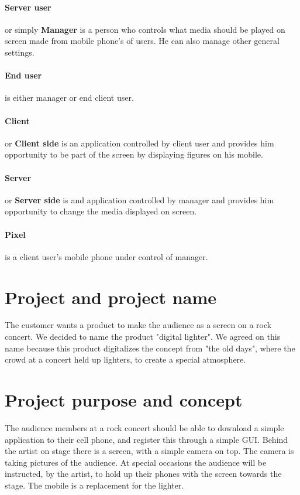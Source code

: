 \paragraph{Server user}
or simply \textbf{Manager} is a person who controls what media should be played on screen made from mobile phone's of users. 
He can also manage other general settings.

\paragraph{End user} is either manager or end client user.

\paragraph{Client} or \textbf{Client side} is an application controlled by client user and provides him opportunity to be part of the screen by displaying figures on his mobile.

\paragraph{Server} or \textbf{Server side} is and application controlled by manager and provides him opportunity to change the media displayed on screen.

\paragraph{Pixel} is a client user's mobile phone under control of manager.


\section{Project and project name}

The customer wants a product to make the audience as a screen on a rock concert. We decided to name the product "digital lighter". We agreed on this name because this product digitalizes the concept from "the old days", where the crowd at a concert held up lighters, to create a special atmosphere. 

\section{Project purpose and concept}

The audience members at a rock concert should be able to download a simple application to their cell phone, and register this through a simple GUI.
Behind the artist on stage there is a screen, with a simple camera on top. 
The camera is taking pictures of the audience. 
At special occasions the audience will be instructed, by the artist, to hold up their phones with the screen towards the stage. 
The mobile is a replacement for the lighter.  

